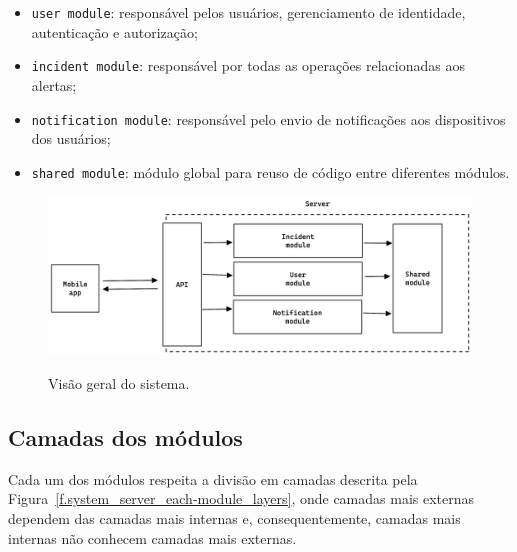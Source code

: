 \begin{itemize}
	\item \texttt{user module}: responsável pelos usuários, gerenciamento de identidade, autenticação e autorização;
	\item \texttt{incident module}: responsável por todas as operações relacionadas aos alertas;
	\item \texttt{notification module}: responsável pelo envio de notificações aos dispositivos dos usuários;
	\item \texttt{shared module}: módulo global para reuso de código entre diferentes módulos.
\end{itemize}

\begin{figure}[h]
	\caption{\small Visão geral do sistema.}
	\centering
	\includegraphics[width=\textwidth]{../diagrams/out/system_server.png}
	\label{f.system_server}
\end{figure}

\subsection{Camadas dos módulos}

Cada um dos módulos respeita a divisão em camadas descrita pela Figura~\ref{f.system_server_each-module_layers}, onde camadas mais externas dependem das camadas mais internas e, consequentemente, camadas mais internas não conhecem camadas mais externas. 

